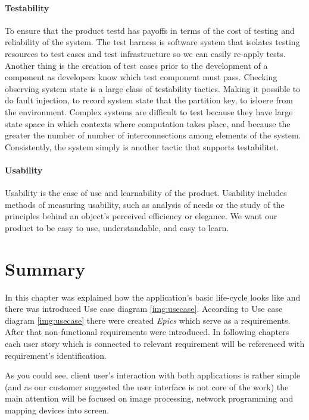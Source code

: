 \paragraph{Testability}

To ensure that the product testd has payoffs in terms of the cost of testing and reliability of the system. The test harness is software system that isolates testing resources to test cases and test infrastructure so we can easily re-apply tests. Another thing is the creation of test cases prior to the development of a component as developers know which test component must pass. Checking observing system state is a large class of testability tactics. Making it possible to do fault injection, to record system state that the partition key, to isloere from the environment. Complex systems are difficult to test because they have large state space in which contexts where computation takes place, and because the greater the number of number of interconnections among elements of the system. Consistently, the system simply is another tactic that supports testabilitet.

\paragraph{Usability}
Usability is the ease of use and learnability of the product.
Usability includes methods of measuring usability, such as analysis of needs or the study of the principles behind an object's perceived efficiency or elegance. We want our product to be easy to use, understandable, and easy to learn.  

\section{Summary}
In this chapter was explained how the application's basic life-cycle looks like and there was introduced Use case diagram \ref{img:usecase}.
According to Use case diagram \ref{img:usecase} there were created \emph{Epics} which serve as a requirements. 
After that non-functional requirements were introduced.
In following chapters each user story which is connected to relevant requirement will be referenced with requirement's identification.

As you could see, client user's interaction with both applications is rather simple (and as our customer suggested the user interface is not core of the work) the main attention will be focused on image processing, network programming and mapping devices into screen.

